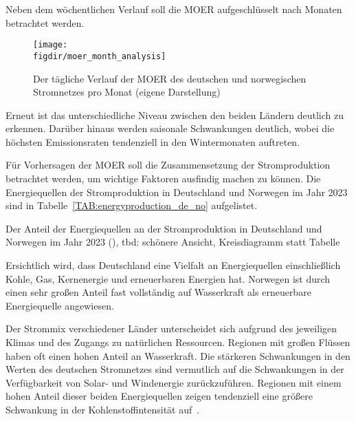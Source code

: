 Neben dem wöchentlichen Verlauf soll die \ac{MOER} aufgeschlüsselt nach Monaten betrachtet werden.
\begin{figure}
 \caption{Der tägliche Verlauf der MOER des deutschen und norwegischen Stromnetzes pro Monat (eigene Darstellung)}
 {\texttt{[image: \\figdir/moer\_month\_analysis]}}
 \label{FIG:moer_month_analysis}
\end{figure}
Erneut ist das unterschiedliche Niveau zwischen den beiden Ländern deutlich zu erkennen.
Darüber hinaus werden saisonale Schwankungen deutlich, wobei die höchsten Emissionsraten tendenziell in den Wintermonaten auftreten.

Für Vorhersagen der \ac{MOER} soll die Zusammensetzung der Stromproduktion betrachtet werden, um wichtige Faktoren ausfindig machen zu können.
Die Energiequellen der Stromproduktion in Deutschland und Norwegen im Jahr 2023 sind in Tabelle~\ref{TAB:energyproduction_de_no} aufgelistet.
\begin{table}[t]
 \centering\small
 \caption{Der Anteil der Energiequellen an der Stromproduktion in Deutschland und Norwegen im Jahr 2023 (\cite{ElectricityMaps.20240305T20:54:29.000Z}), tbd: schönere Ansicht, Kreisdiagramm statt Tabelle}
 \label{TAB:energyproduction_de_no}
 
\end{table}
Ersichtlich wird, dass Deutschland eine Vielfalt an Energiequellen einschließlich Kohle, Gas, Kernenergie und erneuerbaren Energien hat.
Norwegen ist durch einen sehr großen Anteil fast vollständig auf Wasserkraft als erneuerbare Energiequelle angewiesen.

Der Strommix verschiedener Länder unterscheidet sich aufgrund des jeweiligen Klimas und des Zugangs zu natürlichen Ressourcen.
Regionen mit großen Flüssen haben oft einen hohen Anteil an Wasserkraft.
Die stärkeren Schwankungen in den Werten des deutschen Stromnetzes sind vermutlich auf die Schwankungen in der Verfügbarkeit von Solar- und Windenergie zurückzuführen.
Regionen mit einem hohen Anteil dieser beiden Energiequellen zeigen tendenziell eine größere Schwankung in der Kohlenstoffintensität auf~\cite{Sukprasert.2023}.

